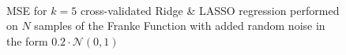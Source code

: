 \documentclass[reprint, english, nofootinbib]{revtex4-2}
\begin{document}
\begin{figure}
{     }
     \\
     \caption{MSE for $k=5$ cross-validated Ridge \& LASSO regression performed on $N$ samples of the Franke Function with added random noise in the form $0.2\cdot\mathcal N(0, 1)$}
     \label{fig:franke_contour_plots}
\end{figure}
\end{document}
